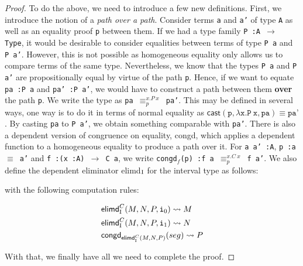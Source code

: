 \documentclass[12pt,twoside,maitrise]{dms}
\theoremstyle{definition}
\numberwithin{equation}{section}
\numberwithin{table}{chapter}
\numberwithin{figure}{chapter}
\newcommand\kw[1] {\textsf{#1}}
\newcommand\id[1] {\texttt{#1}}
\newcommand\fn[1] {\texttt{#1}}
\begin{document}
\begin{proof}
To do the above, we need to introduce a few new definitions. First, we introduce
the notion of a \emph{path over a path}\cite{licata2015cubical}. Consider terms
\id{a} and \id{a'} of type \id{A} as well as an equality proof \id{p} between
them. If we had a type family \fn{P :\@ A $\rightarrow$ Type}, it would be
desirable to consider equalities between terms of type \fn{P a} and \fn{P a'}.
However, this is not possible as homogeneous equality only allows us to compare
terms of the same type. Nevertheless, we know that the types \fn{P a} and \fn{P
  a'} are propositionally equal by virtue of the path \id{p}. Hence, if we want
to equate \fn{pa :\@ P a} and \fn{pa' :\@ P a'}, we would have to
construct a path between them \textbf{over} the path \id{p}. We write the type
as \fn{pa $\equiv^{x. P \ x}_{p}$ pa'}. This may be defined in several ways, one
way is to do it in terms of normal equality as $\kw{cast}(\id{p}, \lambda \id{x}
. \id{P} \ \id{x}, \id{pa}) \equiv \id{pa'}$. By casting \id{pa} to \id{P a'},
we obtain something comparable with \id{pa'}. There is also a dependent version
of congruence on equality, \kw{congd}, which applies a dependent function to a
homogeneous equality to produce a path over it. For \fn{a a' :\@ A}, \fn{p
  :\@ a $\equiv$ a'} and \fn{f :\@ (x :\@ A) $\rightarrow$ C a}, we write
\fn{\kw{congd}$_{f}$(p) :\@ f a $\equiv^{x. C \ x}_{p}$ f a'}. We also
define the dependent eliminator \kw{elimd}$_{\mathrm{I}}$ for the interval type as
follows:

\begin{prooftree*}
   \infer4{\oftype{\ctx, \oftype{i}{\bI}}{\kw{elimd}_{\bI}^{C} (M, N, P, i)}{C \ i}}
\end{prooftree*}


with the following computation rules:

\begin{align*}
  & \kw{elimd}_{\bI}^{C}(M, N, P, \ileft) \leadsto{} M \\
  & \kw{elimd}_{\bI}^{C}(M, N, P, \iright) \leadsto{} N \\
  & \kw{congd}_{\kw{elimd}_{\bI}^{C}(M, N, P)}(seg) \leadsto{} P
\end{align*}


With that, we finally have all we need to complete the proof.


\end{proof}
\end{document}
